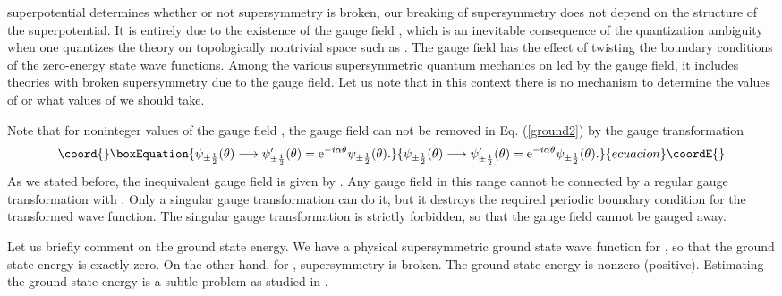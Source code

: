 \documentclass[a4paper,12pt]{article}
\begin{document}
superpotential determines whether or not supersymmetry is broken, our
breaking of supersymmetry does not 
depend on the structure of the superpotential. It is entirely 
due to the existence of the gauge field \myHighlight{$\alpha$}\coordHE{}, which 
is an inevitable consequence of the quantization ambiguity 
when one quantizes the theory on topologically nontrivial 
space such as \coordHE{}. The gauge field has the effect of twisting the boundary 
conditions of the zero-energy state wave functions. 
Among the various supersymmetric quantum 
mechanics on \coordHE{} led by the gauge field, it includes theories 
with broken supersymmetry due to the gauge field.
Let us note that in this context there is no mechanism to determine
the values of \myHighlight{$\alpha$}\coordHE{} or what values of \myHighlight{$\alpha$}\coordHE{} we should take. 
\par
Note that for noninteger values of the gauge field \myHighlight{$\alpha$}\coordHE{}, the gauge 
field can not be 
removed in Eq. (\ref{ground2}) by the gauge transformation  
\begin{equation}\coord{}\boxEquation{
\psi_{\pm \half}(\theta)\longrightarrow 
\psi_{\pm \half}^{\prime}(\theta)=\e^{-i\alpha\theta}\psi_{\pm \half}(\theta).
\label{gaugetrf}
}{
\psi_{\pm \half}(\theta)\longrightarrow 
\psi_{\pm \half}^{\prime}(\theta)=\e^{-i\alpha\theta}\psi_{\pm \half}(\theta).
}{ecuacion}\coordE{}\end{equation}
As we stated before, the inequivalent gauge field is given by
\coordHE{}. Any gauge field in this range cannot be connected by
a regular gauge transformation with \coordHE{}. 
Only a singular gauge transformation can do it, but it destroys the required
periodic boundary condition for the transformed wave function.      
The singular gauge transformation is strictly 
forbidden, so that the gauge field cannot be gauged away.
\par
Let us briefly comment on the ground state energy. We have a physical
supersymmetric ground state wave function for \coordHE{}, so that 
the ground state energy is exactly zero. 
On the other hand, for \coordHE{}, supersymmetry 
is broken. The ground state energy is nonzero (positive).
Estimating the ground state energy is a subtle 
problem as studied in \cite{abbott1}\cite{abbott2}. 
\par
\end{document}
